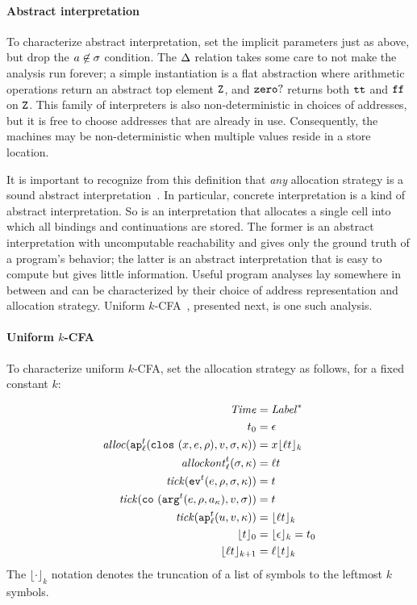\documentclass[9pt]{sigplanconf} %
\begin{document}
\paragraph{Abstract interpretation}
%
To characterize abstract interpretation, set the implicit parameters just as above, but drop the $\maddr \not\in \msto$ condition.
%
The $\interpdelta$ relation takes some care to not make the analysis run forever; a simple instantiation is a flat abstraction where arithmetic operations return an abstract top element $\sNum$, and $\szerohuh$ returns both $\strue$ and $\sfalse$ on $\sNum$.
%
This family of interpreters is also non-deterministic in choices of addresses, but it is free to choose addresses that are already in use.
%
Consequently, the machines may be non-deterministic when multiple values reside in a store location.

It is important to recognize from this definition that \emph{any} allocation strategy is a sound abstract interpretation~\cite{dvanhorn:Might2009Posteriori}.
%
In particular, concrete interpretation is a kind of abstract interpretation.
%
So is an interpretation that allocates a single cell into which all bindings and continuations are stored.
%
The former is an abstract interpretation with uncomputable reachability and gives only the ground truth of a program's behavior; the latter is an abstract interpretation that is easy to compute but gives little information.
%
Useful program analyses lay somewhere in between and can be characterized by their choice of address representation and allocation strategy.
%
Uniform \(k\)-CFA~\cite{dvanhorn:nielson-nielson-popl97}, presented next, is one such analysis.

\paragraph{Uniform \(k\)-CFA}
%
To characterize uniform \(k\)-CFA, set the allocation strategy as follows, for a fixed constant \(k\):

{\small
\begin{align*}
\Counter &= \Label^* \\
\mtcntr &= \epsilon \\
\alloc(\ap[^\mcntr_\mlab]{\clos{\mvar,\mexp,\menv},\mval,\msto,\mkont}) &= \mvar\kpush[_k]{\mlab\mcntr} \\
\allockont^\mcntr_\mlab(\msto,\mkont) &= \mlab\mcntr \\
\tick(\ev[^\mcntr]{\mexp,\menv,\msto,\mkont}) &= \mcntr \\
\tick(\co{\kar[^\mcntr]{\mexp,\menv,\mkaddr},\mval,\msto}) &= \mcntr \\
\tick(\ap[^\mcntr_\mlab]{\mvalx{u},\mval,\mkont}) &= \kpush[_k]{\mlab\mcntr} \\
  \kpush[_0]{\mcntr} &= \kpush[_k]{\epsilon} = \mtcntr \\
  \kpush[_{k+1}]{\mlab\mcntr} &= \mlab\kpush[_k]{\mcntr} \\
\end{align*}}
The \(\lfloor\cdot\rfloor_k\) notation denotes the truncation of a list
of symbols to the leftmost \(k\) symbols.
\end{document}
